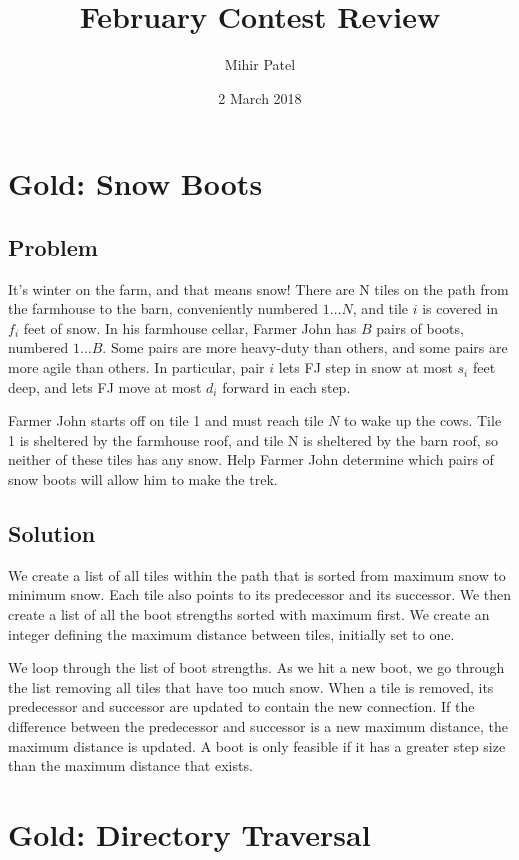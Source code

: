 \documentclass[11pt]{article}
\title{February Contest Review}
\author{Mihir Patel}
\date{2 March 2018}
\begin{document}
\maketitle

\section{Gold: Snow Boots}

\subsection{Problem}

It's winter on the farm, and that means snow! There are N tiles on the path from the farmhouse to the barn, conveniently numbered $1…N$, and tile $i$ is covered in $f_i$ feet of snow.
In his farmhouse cellar, Farmer John has $B$ pairs of boots, numbered $1…B$. Some pairs are more heavy-duty than others, and some pairs are more agile than others. In particular, pair $i$ lets FJ step in snow at most $s_i$ feet deep, and lets FJ move at most $d_i$ forward in each step.

Farmer John starts off on tile 1 and must reach tile $N$ to wake up the cows. Tile 1 is sheltered by the farmhouse roof, and tile N is sheltered by the barn roof, so neither of these tiles has any snow. Help Farmer John determine which pairs of snow boots will allow him to make the trek.

\subsection{Solution}

We create a list of all tiles within the path that is sorted from maximum snow to minimum snow. Each tile also points to its predecessor and its successor. We then create a list of all the boot strengths sorted with maximum first. We create an integer defining the maximum distance between tiles, initially set to one.

We loop through the list of boot strengths. As we hit a new boot, we go through the list removing all tiles that have too much snow. When a tile is removed, its predecessor and successor are updated to contain the new connection. If the difference between the predecessor and successor is a new maximum distance, the maximum distance is updated. A boot is only feasible if it has a greater step size than the maximum distance that exists.

\section{Gold: Directory Traversal}
\end{document}
